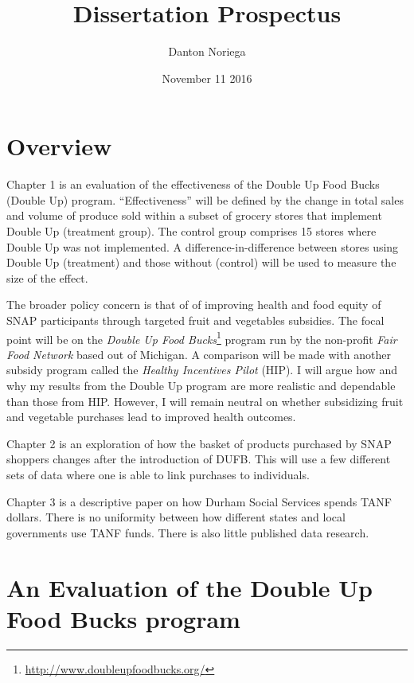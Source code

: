 \documentclass[12pt,letterpaperpaper,]{book}
\title{Dissertation Prospectus}
\author{Danton Noriega}
\date{November 11 2016}
\renewcommand{\href}[2]{#2\footnote{\url{#1}}}
\begin{document}
\maketitle

\setlength{\abovedisplayskip}{-5pt}
\setlength{\abovedisplayshortskip}{-5pt}
\frontmatter

{
\setcounter{tocdepth}{2}
\tableofcontents
}
\chapter{Overview}\label{overview}

Chapter 1 is an evaluation of the effectiveness of the Double Up Food
Bucks (Double Up) program. ``Effectiveness'' will be defined by the
change in total sales and volume of produce sold within a subset of
grocery stores that implement Double Up (treatment group). The control
group comprises 15 stores where Double Up was not implemented. A
difference-in-difference between stores using Double Up (treatment) and
those without (control) will be used to measure the size of the effect.

The broader policy concern is that of of improving health and food
equity of SNAP participants through targeted fruit and vegetables
subsidies. The focal point will be on the
\href{http://www.doubleupfoodbucks.org/}{\emph{Double Up Food Bucks}}
program run by the non-profit \emph{Fair Food Network} based out of
Michigan. A comparison will be made with another subsidy program called
the \emph{Healthy Incentives Pilot} (HIP). I will argue how and why my
results from the Double Up program are more realistic and dependable
than those from HIP. However, I will remain neutral on whether
subsidizing fruit and vegetable purchases lead to improved health
outcomes.

Chapter 2 is an exploration of how the basket of products purchased by
SNAP shoppers changes after the introduction of DUFB. This will use a
few different sets of data where one is able to link purchases to
individuals.

Chapter 3 is a descriptive paper on how Durham Social Services spends
TANF dollars. There is no uniformity between how different states and
local governments use TANF funds. There is also little published data
research.

\chapter{An Evaluation of the Double Up Food Bucks
program}\label{chapter-1}
\end{document}
